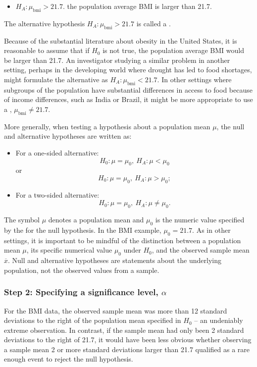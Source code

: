\begin{spacing}{1.5}
\begin{itemize}
	\item $H_A: \mu_{\text{bmi}} > 21.7$. the population average BMI is larger than 21.7.
	
\end{itemize}	
The alternative hypothesis $H_A: \mu_{\text{bmi}} > 21.7$ is called a . 

Because of the substantial literature about obesity in the United States, it is reasonable to assume that if $H_0$ is not true, the population average BMI would be larger than 21.7.  An investigator studying a similar problem in another setting, perhaps in the developing world where drought has led to food shortages, might formulate the alternative as $ H_A:\mu_{\text{bmi}} < 21.7$. In other settings where subgroups of the population have  substantial differences in access to food because of income differences, such as India or Brazil, it might be more appropriate to use a , $\mu_{\text{bmi}} \neq 21.7$. 

More generally, when testing a hypothesis about a population mean $\mu$, the null and alternative hypotheses are written as:

\begin{itemize}
	\item For a one-sided alternative: \[H_0: \mu = \mu_0, \ H_A: \mu < \mu_0\] or \[H_0: \mu = \mu_0, \  H_A: \mu > \mu_0;\]
	
	\item For a two-sided alternative: \[H_0: \mu = \mu_0, \ H_A: \mu \neq \mu_0.\]
\end{itemize}


The symbol $\mu$ denotes a population mean and $\mu_0$ is the numeric value specified by the for the null hypothesis. In the BMI example, $\mu_0 = 21.7$.  As in other settings, it is important to be mindful of the distinction between a population mean $\mu$, its specific numerical value $\mu_0$ under $H_0$,  and the observed sample mean $\overline{x}$.  Null and alternative hypotheses are statements about the underlying population, not the observed values from a sample.

\subsubsection{Step 2: Specifying a significance level, $\alpha$}

For the  BMI data, the observed sample mean was more than 12 standard deviations to the right of the population mean specified in $H_0$ -- an undeniably extreme observation. In contrast, if the sample mean had only been 2 standard deviations to the right of 21.7, it would have been less obvious whether observing a sample mean 2 or more standard deviations larger than 21.7 qualified as a rare enough event to reject the null hypothesis. 


\end{spacing}
